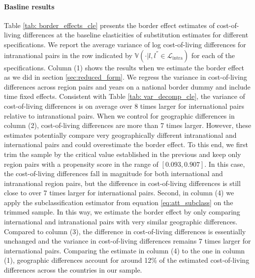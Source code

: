 \paragraph{Basline results} Table \ref{tab: border_effects_cle} presents the border effect estimates of cost-of-living differences at the baseline elasticities of substitution estimates for different specifications. We report the average variance of log cost-of-living differences for intranational pairs in the row indicated by $\mathbb{V}\left(\cdot|l,l^{''} \in \mathcal{L}_{\text{intra}} \right)$ for each of the specifications. Column (1) shows the results when we estimate the border effect as we did in section \ref{sec:reduced_form}. We regress the variance in cost-of-living differences across region pairs and years on a national border dummy and include time fixed effects. Consistent with Table \ref{tab: var_decomp_cle}, the variance of cost-of-living differences is on average over 8 times larger for international pairs relative to intranational pairs. When we control for geographic differences in column (2), cost-of-living differences are more than 7 times larger. However, these estimates potentially compare very geographically different intranational and international pairs and could overestimate the border effect. To this end, we first trim the sample by the critical value established in the previous and keep only region pairs with a propensity score in the range of $[0.093,0.907]$. In this case, the cost-of-living differences fall in magnitude for both international and intranational region pairs, but the difference in cost-of-living differences is still close to over 7 times larger for international pairs. Second, in column (4) we apply the subclassification estimator from equation \ref{eq:att_subclass} on the trimmed sample. In this way, we estimate the border effect by only comparing international and intranational pairs with very similar geographic differences. Compared to column (3), the difference in cost-of-living differences is essentially unchanged and the variance in cost-of-living differences remains 7 times larger for international pairs. Comparing the estimate in column (4) to the one in column (1), geographic differences account for around 12\% of the estimated cost-of-living differences across the countries in our sample.  

